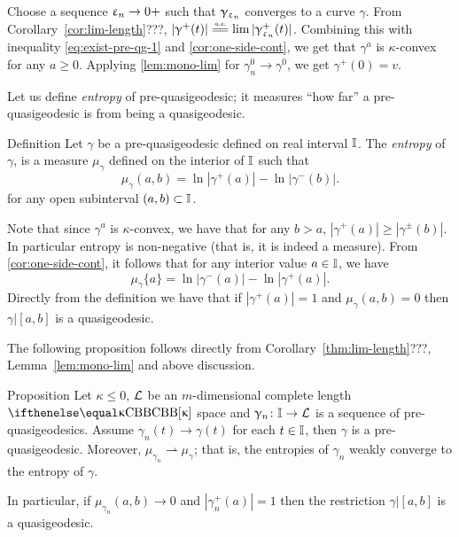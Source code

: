 \smallskip

Choose a sequence $\eps_n\to0+$ such that $\upgamma_{\upvarepsilon_n}$ converges to a curve $\gamma$.
From Corollary~\ref{cor:lim-length}???, $|\gamma^+(t)|\ae\lim|\gamma_{\eps_n}^+(t)|$.
Combining this with inequality \ref{eq:exist-pre-qg-1} and \ref{cor:one-side-cont}, we get that
$\gamma^{a}$
is $\kappa$-convex for any $a\ge0$.
Applying \ref{lem:mono-lim} for $\gamma_n^0\to \gamma^0$, we get $\gamma^+(0)=v$.
\qeds



Let us  define \emph{entropy} of pre-\nospace quasigeodesic;
it measures ``how far''
a pre-quasigeodesic is from being a quasigeodesic.

\begin{thm}{Definition}\label{def:entropy}
Let $\gamma$ be a pre-quasigeodesic defined on real interval $\mathbb{I}$.
The \emph{entropy} of $\gamma$,  is a measure $\mu_\gamma$ defined  on the interior of $\mathbb{I}$
such that
\[ \mu_\gamma (a,b)=\ln |\gamma^+(a)|-\ln |\gamma^-(b)|.\]
for any open subinterval $(a,b)\subset\II$.
\end{thm}

Note that since $\gamma^a$ is $\kappa$-convex, we have that for any $b>a$, $|\gamma^+(a)|\ge|\gamma^\pm(b)|$.
In particular entropy is non-negative (that is, it is indeed a measure).
From \ref{cor:one-side-cont}, it follows that for any interior value $a\in\II$, we have
\[\mu_\gamma\{a\}=\ln|\gamma^-(a)|-\ln|\gamma^+(a)|.\]
Directly from the definition we have that if $|\gamma^+(a)|=1$ and $\mu_\gamma(a,b)=0$ then $\gamma|[a,b]$ is a quasigeodesic.


The following proposition follows directly from 
Corollary~\ref{thm:lim-length}???, 
Lemma~\ref{lem:mono-lim} 
and above discussion.


\begin{thm}{Proposition}\label{lim-entropy}
Let $\kappa\le 0$, 
$\mathcal{L}$ be an $m$-dimensional complete length $\Alex\kappa$ space
and $\gamma_n\:\II\to \spc{L}$ is a sequence of pre-quasigeodesics.
Assume $\gamma_n(t)\to\gamma(t)$ for each $t\in \II$,
then $\gamma$ is a pre-quasigeodesic.
Moreover, $\mu_{\gamma_n}\rightharpoonup\mu_\gamma$; 
that is, the entropies of $\gamma_n$ weakly converge to the entropy of $\gamma$.

In particular, 
if $\mu_{\gamma_n}(a,b)\to0$ and $|\gamma_n^+(a)|=1$ then the restriction $\gamma|[a,b]$ is a quasigeodesic.
\end{thm}




